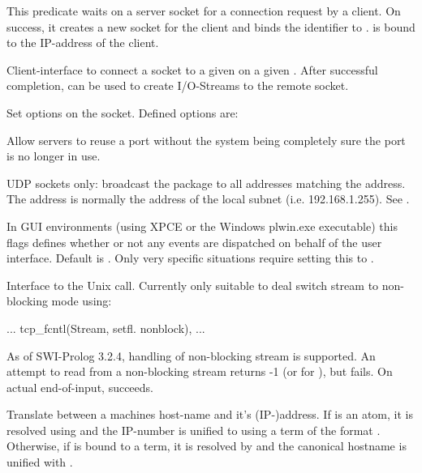\documentclass[11pt]{article}
\begin{document}
\begin{description}
This predicate waits on a server socket for a connection request by
a client.  On success, it creates a new socket for the client and
binds the identifier to .    is bound to the
IP-address of the client.

Client-interface to connect a socket to a given  on a given
.  After successful completion,  can be used to
create I/O-Streams to the remote socket.

Set options on the socket.  Defined options are:

\begin{description}
Allow servers to reuse a port without the system being completely sure
the port is no longer in use.

UDP sockets only: broadcast the package to all addresses matching the
address.  The address is normally the address of the local subnet
(i.e. 192.168.1.255).  See .

In GUI environments (using XPCE or the Windows plwin.exe executable)
this flags defines whether or not any events are dispatched on behalf of
the user interface. Default is . Only very specific
situations require setting this to .
\end{description}

Interface to the Unix  call.  Currently only suitable
to deal switch stream to non-blocking mode using:

\begin{code}
        ...
        tcp_fcntl(Stream, setfl. nonblock),
        ...
\end{code}

\noindent
As of SWI-Prolog 3.2.4, handling of non-blocking stream is supported. An
attempt to read from a non-blocking stream returns -1 (or
 for ), but  fails. On actual
end-of-input,  succeeds.

Translate between a machines host-name and it's (IP-)address. If
 is an atom, it is resolved using
 and the IP-number is unified to 
using a term of the format .
Otherwise, if  is bound to a  term, it
is resolved by  and the canonical hostname
is unified with .


\end{description}
\end{document}
